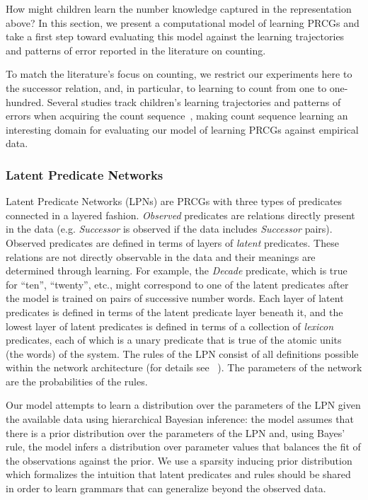 \documentclass[10pt,letterpaper]{article}
\begin{document}
How might children learn the number knowledge captured in the
representation above? In this section, we present a computational
model of learning PRCGs and take a first step toward evaluating this
model against the learning trajectories and patterns of error reported
in the literature on counting.

To match the literature's focus on counting, we restrict our
experiments here to the successor relation, and, in particular, to
learning to count from one to one-hundred. Several studies track
children's learning trajectories and patterns of errors when acquiring
the count sequence~\citep{FusRicBriar1982,miller1987counting}, making
count sequence learning an interesting domain for evaluating our model
of learning PRCGs against empirical data.

\subsubsection{Latent Predicate Networks}

Latent Predicate Networks (LPNs) are PRCGs with three types of
predicates connected in a layered fashion. \emph{Observed} predicates
are relations directly present in the data (e.g. \emph{Successor} is
observed if the data includes \emph{Successor} pairs). Observed
predicates are defined in terms of layers of \emph{latent} predicates.
These relations are not directly observable in the data and their
meanings are determined through learning. For example, the
\emph{Decade} predicate, which is true for ``ten'', ``twenty'', etc.,
might correspond to one of the latent predicates after the model is
trained on pairs of successive number words. Each layer of latent
predicates is defined in terms of the latent predicate layer beneath
it, and the lowest layer of latent predicates is defined in terms of a
collection of \emph{lexicon} predicates, each of which is a unary
predicate that is true of the atomic units (the words) of the system.
The rules of the LPN consist of all definitions possible within the
network architecture (for details see ~\cite{DecRulTen2015}). The
parameters of the network are the probabilities of the rules.

Our model attempts to learn a distribution over the parameters of the
LPN given the available data using hierarchical Bayesian
inference: the model assumes that there is a prior distribution over
the parameters of the LPN and, using Bayes' rule, the model infers a
distribution over parameter values that balances the fit of the
observations against the prior. We use a sparsity inducing prior
distribution which formalizes the intuition that latent predicates and
rules should be shared in order to learn grammars that can generalize
beyond the observed data.
\end{document}
